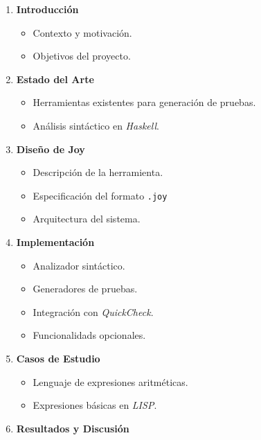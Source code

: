 \documentclass[12pt]{article}
\begin{document}
\begin{enumerate}
\item \textbf{Introducción}
  
  \begin{itemize}
  \item Contexto y motivación.
  \item Objetivos del proyecto.
  \end{itemize}


\item \textbf{Estado del Arte}

  \begin{itemize}
  \item Herramientas existentes para generación de pruebas.
  \item Análisis sintáctico en \textit{Haskell}.
  \end{itemize}

\item \textbf{Diseño de Joy}

  \begin{itemize}
  \item Descripción de la herramienta.
  \item Especificación del formato \texttt{.joy}
  \item Arquitectura del sistema.
  \end{itemize}

\item \textbf{Implementación}

  \begin{itemize}
  \item Analizador sintáctico.
  \item Generadores de pruebas.
  \item Integración con \textit{QuickCheck}.
  \item Funcionalidads opcionales.
  \end{itemize}
  
\item \textbf{Casos de Estudio}

  \begin{itemize}
  \item Lenguaje de expresiones aritméticas.
  \item Expresiones básicas en \textit{LISP}.
  \end{itemize}

\item \textbf{Resultados y Discusión}


\end{enumerate}
\end{document}

